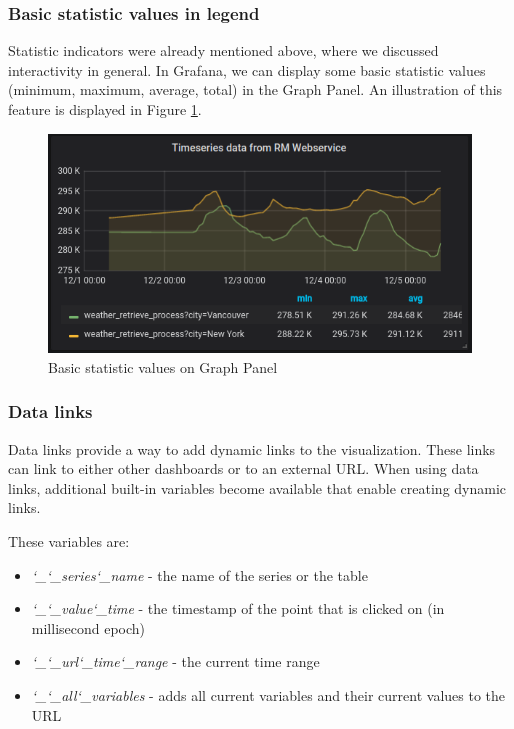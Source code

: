 \subsubsection{Basic statistic values in legend}

Statistic indicators were already mentioned above, where we discussed interactivity in general. In Grafana, we can display some basic statistic values (minimum, maximum, average, total) in the Graph Panel. An illustration of this feature is displayed in Figure \ref{fig:basic-statistics}.

\begin{figure}[H]
	\centering
	\includegraphics[width=130mm, keepaspectratio]{figures/basic-statistics.png}
	\caption{Basic statistic values on Graph Panel}
	\label{fig:basic-statistics}
\end{figure}

\subsubsection{Data links}

Data links provide a way to add dynamic links to the visualization. These links can link to either other dashboards or to an external URL. When using data links, additional built-in variables become available that enable creating dynamic links.\cite{grafana-graph-datalink}

These variables are:
\begin{itemize}
	\item \emph{\char`_\char`_series\char`_name} - the name of the series or the table
	\item \emph{\char`_\char`_value\char`_time} - the timestamp of the point that is clicked on (in millisecond epoch)
	\item \emph{\char`_\char`_url\char`_time\char`_range} - the current time range
	\item \emph{\char`_\char`_all\char`_variables} - adds all current variables and their current values to the URL
\end{itemize}


